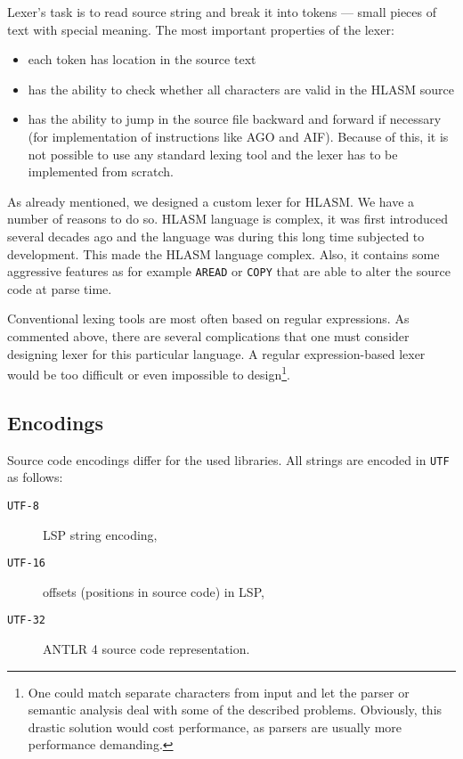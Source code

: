 Lexer's task is to read source string and break it into tokens --- small pieces of text with special meaning. The most important properties of the lexer:
\begin{itemize}
	\item each token has location in the source text
	\item has the ability to check whether all characters are valid in the HLASM source
	\item has the ability to jump in the source file backward and forward if necessary (for implementation of instructions like AGO and AIF). Because of this, it is not possible to use any standard lexing tool and the lexer has to be implemented from scratch.
\end{itemize}

As already mentioned, we designed a custom lexer for HLASM. We have a number of reasons to do so. HLASM language is complex, it was first introduced several decades ago and the language was during this long time subjected to development. This made the HLASM language complex. Also, it contains some aggressive features as for example \texttt{AREAD} or \texttt{COPY} that are able to alter the source code at parse time.

Conventional lexing tools are most often based on regular expressions. As commented above, there are several complications that one must consider designing lexer for this particular language. A regular expression-based lexer would be too difficult or even impossible to design\footnote{One could match separate characters from input and let the parser or semantic analysis deal with some of the described problems. Obviously, this drastic solution would cost performance, as parsers are usually more performance demanding.}.

\subsection{Encodings}
Source code encodings differ for the used libraries. All strings are encoded in \texttt{UTF} as follows:

\begin{description}
	\item[\texttt{UTF-8}] LSP string encoding,
	\item[\texttt{UTF-16}] offsets (positions in source code) in LSP,
	\item[\texttt{UTF-32}] ANTLR 4 source code representation.
\end{description}

